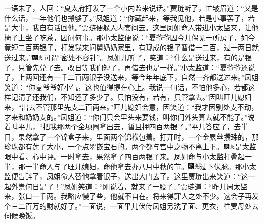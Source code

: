 一语未了，人回：“夏太府打发了一个小内监来说话。”贾琏听了，忙皱眉道：“又是什么话，一年他们也搬够了。”凤姐道：“你藏起来，等我见他，若是小事罢了，若是大事，我自有话回他。”贾琏便躲入内套间去。这里凤姐命人带进小太监来，让他椅子上坐了吃茶，因问何事。那小太监便说：“夏爷爷因今儿偶见一所房子，如今竟短二百两银子，打发我来问舅奶奶家里，有现成的银子暂借一二百，过一两日就送过来。”{\includegraphics[width=3mm]{../Images/00004}\includegraphics[width=3mm]{../Images/00012}\footnotesize \kaishu 可谓“密处不容针”。}凤姐儿听了，笑道：“什么是送过来，有的是银子，只管先兑了去。改日等我们短了，再借去也是一样。”小太监道：“夏爷爷还说了，上两回还有一千二百两银子没送来，等今年年底下，自然一齐都送过来。”凤姐笑道：“你夏爷爷好小气，这也值得提在心上。我说一句话，不怕他多心，若都这样记清了还我们，不知还了多少了。只怕没有，若有，只管拿去。”因叫旺儿媳妇来，“出去不管那里先支二百两来。”旺儿媳妇会意，因笑道：“我才因别处支不动，才来和奶奶支的。”凤姐道：“你们只会里头来要钱，叫你们外头算去就不能了。”说着叫平儿，“把我那两个金项圈拿出去，暂且押四百两银子。”平儿答应了，去半日，果然拿了一个锦盒子来，里面两个锦袱包着。打开时，一个金累丝攒珠的，那珍珠都有莲子大小，一个点翠嵌宝石的。两个都与宫中之物不离上下。{\includegraphics[width=3mm]{../Images/00004}\includegraphics[width=3mm]{../Images/00012}\footnotesize \kaishu 是太监眼中看、心中评。}一时拿去，果然拿了四百两银子来。凤姐命与小太监打叠起一半，那一半命人与了旺儿媳妇，命他拿去办八月中秋的节。{\includegraphics[width=3mm]{../Images/00004}\includegraphics[width=3mm]{../Images/00012}\footnotesize \kaishu 过下伏脉。}那小太监便告辞了，凤姐命人替他拿着银子，送出大门去了。这里贾琏出来笑道：“这一起外祟何日是了！”凤姐笑道：“刚说着，就来了一股子。”贾琏道：“昨儿周太监来，张口一千两。我略应慢了些，他就不自在。将来得罪人之处不少。这会子再发个三二百万的财就好了。”一面说，一面平儿伏侍凤姐另洗了面、更衣，往贾母处去伺候晚饭。

